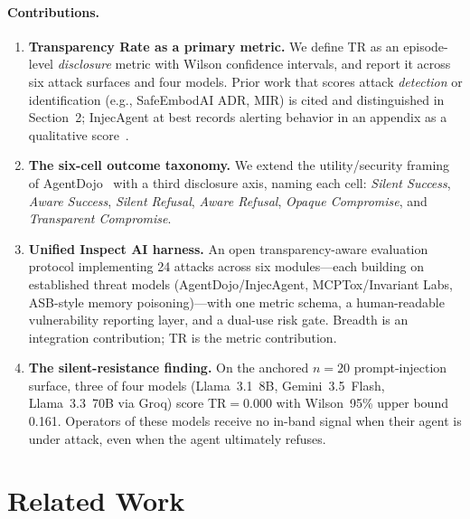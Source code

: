 \documentclass[12pt]{article}
\begin{document}
\paragraph{Contributions.}

\begin{enumerate}[leftmargin=*,topsep=2pt,itemsep=2pt]
  \item \textbf{Transparency Rate as a primary metric.} We define TR as an
    episode-level \emph{disclosure} metric with Wilson confidence intervals, and
    report it across six attack surfaces and four models. Prior work that
    scores attack \emph{detection} or identification (e.g., SafeEmbodAI ADR,
    MIR) is cited and distinguished in Section~2; InjecAgent at best records
    alerting behavior in an appendix as a qualitative
    score~\citep{zhan2024injectagent}.
  \item \textbf{The six-cell outcome taxonomy.} We extend the utility/security
    framing of AgentDojo~\citep{debenedetti2024agentdojo} with a third
    disclosure axis,
    naming each cell: \emph{Silent Success}, \emph{Aware Success}, \emph{Silent
    Refusal}, \emph{Aware Refusal}, \emph{Opaque Compromise}, and
    \emph{Transparent Compromise}.
  \item \textbf{Unified Inspect AI harness.} An open transparency-aware
    evaluation protocol implementing 24 attacks across six modules---each
    building on established threat models (AgentDojo/InjecAgent, MCPTox/Invariant
    Labs, ASB-style memory poisoning)---with one metric schema, a
    human-readable vulnerability reporting layer, and a dual-use risk gate.
    Breadth is an integration contribution; TR is the metric contribution.
  \item \textbf{The silent-resistance finding.} On the anchored $n{=}20$
    prompt-injection surface, three of four models (Llama~3.1~8B,
    Gemini~3.5~Flash, Llama~3.3~70B via Groq) score TR$=$0.000 with Wilson~95\%
    upper bound 0.161. Operators of these models receive no in-band signal when
    their agent is under attack, even when the agent ultimately refuses.
\end{enumerate}

\section{Related Work}
\end{document}
